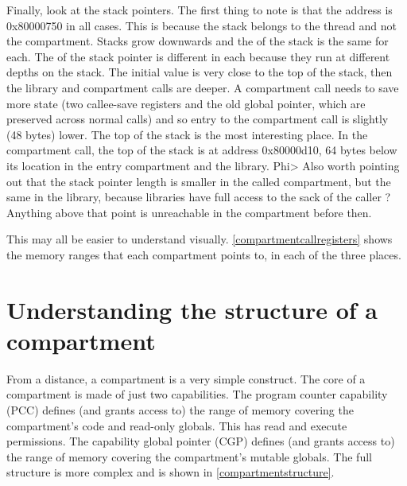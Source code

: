 Finally, look at the stack pointers.
The first thing to note is that the  address is 0x80000750 in all cases.
This is because the stack belongs to the thread and not the compartment. 
Stacks grow downwards and the  of the stack is the same for each.
The  of the stack pointer is different in each because they run at different depths on the stack.
The initial value is very close to the top of the stack, then the library and compartment calls are deeper.
A compartment call needs to save more state (two callee-save registers and the old global pointer, which are preserved across normal calls) and so entry to the compartment call is slightly (48 bytes) lower.
The top of the stack is the most interesting place.
In the compartment call, the top of the stack is at address 0x80000d10, 64 bytes below its location in the entry compartment and the library.
Phi> Also worth pointing out that the stack pointer length is smaller in the called compartment, but the same in the library, because libraries have full access to the sack of the caller ?
Anything above that point is unreachable in the compartment before then.

This may all be easier to understand visually.
\ref{compartmentcallregisters} shows the memory ranges that each compartment points to, in each of the three places.


\section{Understanding the structure of a compartment}

From a distance, a compartment is a very simple construct.
The core of a compartment is made of just two capabilities.
The program counter capability (PCC) defines (and grants access to) the range of memory covering the compartment's code and read-only globals.
This has read and execute permissions.
The capability global pointer (CGP) defines (and grants access to) the range of memory covering the compartment's mutable globals.
The full structure is more complex and is shown in \ref{compartmentstructure}.

